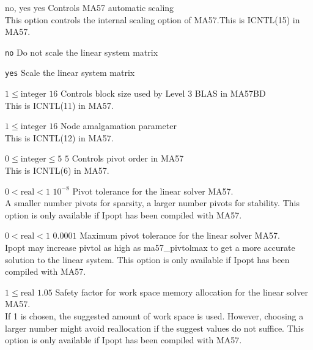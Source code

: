 %
{\ttfamily no, yes}%
{yes}%
{Controls MA57 automatic scaling\\
This option controls the internal scaling option of MA57.This is ICNTL(15) in MA57.}%
{\begin{list}{}{
\setlength{\parsep}{0em}
\setlength{\leftmargin}{5ex}
\setlength{\labelwidth}{2ex}
\setlength{\itemindent}{0ex}
\setlength{\topsep}{0pt}}
\item[\texttt{no}] Do not scale the linear system matrix
\item[\texttt{yes}] Scale the linear system matrix
\end{list}
}

%
{$1\leq\textrm{integer}$}%
{$16$}%
{Controls block size used by Level 3 BLAS in MA57BD\\
This is ICNTL(11) in MA57.}%
{}

%
{$1\leq\textrm{integer}$}%
{$16$}%
{Node amalgamation parameter\\
This is ICNTL(12) in MA57.}%
{}

%
{$0\leq\textrm{integer}\leq5$}%
{$5$}%
{Controls pivot order in MA57\\
This is ICNTL(6) in MA57.}%
{}

%
{$0<\textrm{real}<1$}%
{$10^{- 8}$}%
{Pivot tolerance for the linear solver MA57.\\
A smaller number pivots for sparsity, a larger number pivots for stability. This option is only available if Ipopt has been compiled with MA57.}%
{}

%
{$0<\textrm{real}<1$}%
{$0.0001$}%
{Maximum pivot tolerance for the linear solver MA57.\\
Ipopt may increase pivtol as high as ma57\_pivtolmax to get a more accurate solution to the linear system.  This option is only available if Ipopt has been compiled with MA57.}%
{}

%
{$1\leq\textrm{real}$}%
{$1.05$}%
{Safety factor for work space memory allocation for the linear solver MA57.\\
If 1 is chosen, the suggested amount of work space is used.  However, choosing a larger number might avoid reallocation if the suggest values do not suffice.  This option is only available if Ipopt has been compiled with MA57.}%
{}

